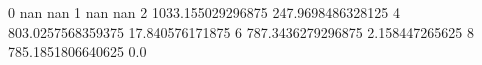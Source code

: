 0 nan nan
1 nan nan
2 1033.155029296875 247.9698486328125
4 803.0257568359375 17.840576171875
6 787.3436279296875 2.158447265625
8 785.1851806640625 0.0
